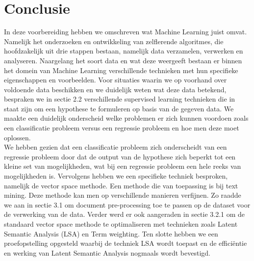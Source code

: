 \chapter{Conclusie}\label{Conclusie}

In deze voorbereiding hebben we omschreven wat Machine Learning juist omvat. Namelijk het onderzoeken en ontwikkeling van zelflerende algoritmes, die hoofdzakelijk uit drie stappen bestaan, namelijk data verzamelen, verwerken en analyseren. Naargelang het soort data en wat deze weergeeft bestaan er binnen het domein van Machine Learning verschillende technieken met hun specifieke eigenschappen en voorbeelden. Voor situaties waarin we op voorhand over voldoende data beschikken en we duidelijk weten wat deze data betekend, bespraken we in sectie 2.2 verschillende supervised learning technieken die in staat zijn om een hypothese te formuleren op basis van de gegeven data. We maakte een duidelijk onderscheid welke problemen er zich kunnen voordoen zoals een classificatie probleem versus een regressie probleem en hoe men deze moet oplossen.\\ We hebben gezien dat een classificatie probleem zich onderscheidt van een regressie probleem door dat de output van de hypothese zich beperkt tot een kleine set van mogelijkheden, wat bij een regressie probleem een hele reeks van mogelijkheden is. 
Vervolgens hebben we een specifieke techniek besproken, namelijk de vector space methode. Een methode die van toepassing is bij text mining. Deze methode kan men op verschillende manieren verfijnen. Zo raadde we aan in sectie 3.1 om document pre-processing toe te passen op de dataset voor de verwerking van de data. Verder werd er ook aangeraden in sectie 3.2.1 om de standaard vector space methode te optimaliseren met technieken zoals Latent Semantic Analysis (LSA) en Term weighting. Ten slotte hebben we een proefopstelling opgesteld waarbij de techniek LSA wordt toepast en de effici\"entie en werking van Latent Semantic Analysis nogmaals wordt bevestigd.

